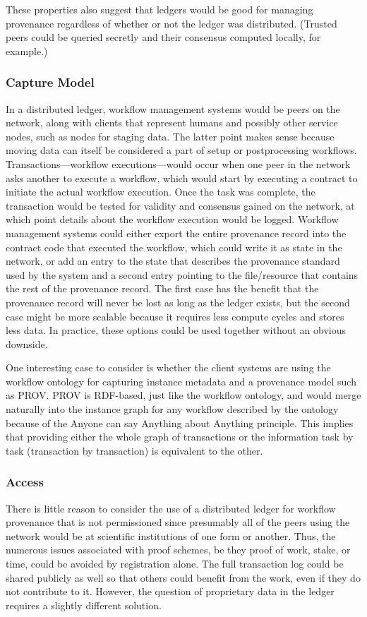 These properties also suggest that ledgers would be good for managing provenance
regardless of whether or not the ledger was distributed. (Trusted peers could be
queried secretly and their consensus computed locally, for example.)

\subsubsection{Capture Model}
In a distributed ledger, workflow management systems would be peers on the
network, along with clients that represent humans and possibly other service
nodes, such as nodes for staging data. The latter point makes sense because
moving data can itself be considered a part of setup or postprocessing
workflows. Transactions---workflow executions---would occur when one peer in the
network asks another to execute a workflow, which would start by executing a
contract to initiate the actual workflow execution. Once the task was complete,
the transaction would be tested for validity and consensus gained on the
network, at which point details about the workflow execution would be logged.
Workflow management systems could either export the entire provenance record
into the contract code that executed the workflow, which could write it as state
in the network, or add an entry to the state that describes the provenance
standard used by the system and a second entry pointing to the file/resource
that contains the rest of the provenance record. The first case has the benefit
that the provenance record will never be lost as long as the ledger exists, but
the second case might be more scalable because it requires less compute cycles
and stores less data. In practice, these options could be used together without
an obvious downside.

One interesting case to consider is whether the client systems are using the
workflow ontology for capturing instance metadata and a provenance model such
as PROV. PROV is RDF-based, just like the workflow ontology, and would merge
naturally into the instance graph for any workflow described by the ontology
because of the Anyone can say Anything about Anything principle. This implies
that providing either the whole graph of transactions or the information task by
task (transaction by transaction) is equivalent to the other.

\subsubsection{Access}
There is little reason to consider the use of a distributed ledger for workflow
provenance that is not permissioned since presumably all of the peers using the
network would be at scientific institutions of one form or another. Thus, the
numerous issues associated with proof schemes, be they proof of work, stake, or
time, could be avoided by registration alone. The full transaction log could be
shared publicly as well so that others could benefit from the work, even if they
do not contribute to it. However, the question of proprietary data in the ledger
requires a slightly different solution.

